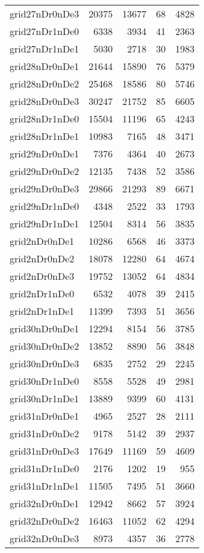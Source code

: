 \begin{longtable}{lrrrr}
grid27nDr0nDe3 & 20375 & 13677 & 68 & 4828 \\
grid27nDr1nDe0 & 6338 & 3934 & 41 & 2363 \\
grid27nDr1nDe1 & 5030 & 2718 & 30 & 1983 \\
grid28nDr0nDe1 & 21644 & 15890 & 76 & 5379 \\
grid28nDr0nDe2 & 25468 & 18586 & 80 & 5746 \\
grid28nDr0nDe3 & 30247 & 21752 & 85 & 6605 \\
grid28nDr1nDe0 & 15504 & 11196 & 65 & 4243 \\
grid28nDr1nDe1 & 10983 & 7165 & 48 & 3471 \\
grid29nDr0nDe1 & 7376 & 4364 & 40 & 2673 \\
grid29nDr0nDe2 & 12135 & 7438 & 52 & 3586 \\
grid29nDr0nDe3 & 29866 & 21293 & 89 & 6671 \\
grid29nDr1nDe0 & 4348 & 2522 & 33 & 1793 \\
grid29nDr1nDe1 & 12504 & 8314 & 56 & 3835 \\
grid2nDr0nDe1 & 10286 & 6568 & 46 & 3373 \\
grid2nDr0nDe2 & 18078 & 12280 & 64 & 4674 \\
grid2nDr0nDe3 & 19752 & 13052 & 64 & 4834 \\
grid2nDr1nDe0 & 6532 & 4078 & 39 & 2415 \\
grid2nDr1nDe1 & 11399 & 7393 & 51 & 3656 \\
grid30nDr0nDe1 & 12294 & 8154 & 56 & 3785 \\
grid30nDr0nDe2 & 13852 & 8890 & 56 & 3848 \\
grid30nDr0nDe3 & 6835 & 2752 & 29 & 2245 \\
grid30nDr1nDe0 & 8558 & 5528 & 49 & 2981 \\
grid30nDr1nDe1 & 13889 & 9399 & 60 & 4131 \\
grid31nDr0nDe1 & 4965 & 2527 & 28 & 2111 \\
grid31nDr0nDe2 & 9178 & 5142 & 39 & 2937 \\
grid31nDr0nDe3 & 17649 & 11169 & 59 & 4609 \\
grid31nDr1nDe0 & 2176 & 1202 & 19 & 955 \\
grid31nDr1nDe1 & 11505 & 7495 & 51 & 3660 \\
grid32nDr0nDe1 & 12942 & 8662 & 57 & 3924 \\
grid32nDr0nDe2 & 16463 & 11052 & 62 & 4294 \\
grid32nDr0nDe3 & 8973 & 4357 & 36 & 2778 \\

\end{longtable}
